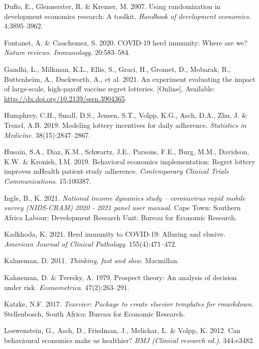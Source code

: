 \documentclass[11pt,preprint, authoryear]{elsarticle}
\numberwithin{equation}{section}
\numberwithin{figure}{section}
\numberwithin{table}{section}
\newlength{\cslhangindent}
\newenvironment{CSLReferences}%
  {\setlength{\parindent}{0pt}%
  \everypar{\setlength{\hangindent}{\cslhangindent}}\ignorespaces}%
  {\par}
\begin{document}
\begin{CSLReferences}{1}{0}
\leavevmode\hypertarget{ref-random}{}%
Duflo, E., Glennerster, R. \& Kremer, M. 2007. Using randomization in
development economics research: A toolkit. \emph{Handbook of development
economics}. 4:3895--3962.

\leavevmode\hypertarget{ref-immun}{}%
Fontanet, A. \& Cauchemez, S. 2020. COVID-19 herd immunity: Where are
we? \emph{Nature reviews. Immunology}. 20:583--584.

\leavevmode\hypertarget{ref-duck}{}%
Gandhi, L., Milkman, K.L., Ellis, S., Graci, H., Gromet, D., Mobarak,
R., Buttenheim, A., Duckworth, A., et al. 2021. An experiment evaluating
the impact of large-scale, high-payoff vaccine regret lotteries.
{[}Online{]}, Available: \url{http://dx.doi.org/10.2139/ssrn.3904365}.

\leavevmode\hypertarget{ref-adhere}{}%
Humphrey, C.H., Small, D.S., Jensen, S.T., Volpp, K.G., Asch, D.A., Zhu,
J. \& Troxel, A.B. 2019. Modeling lottery incentives for daily
adherence. \emph{Statistics in Medicine}. 38(15):2847--2867.

\leavevmode\hypertarget{ref-regr}{}%
Husain, S.A., Diaz, K.M., Schwartz, J.E., Parsons, F.E., Burg, M.M.,
Davidson, K.W. \& Kronish, I.M. 2019. Behavioral economics
implementation: Regret lottery improves mHealth patient study adherence.
\emph{Contemporary Clinical Trials Communications}. 15:100387.

\leavevmode\hypertarget{ref-nids}{}%
Ingle, B., K. 2021. \emph{National income dynamics study -- coronavirus
rapid mobile survey (NIDS-CRAM) 2020 - 2021 panel user manual.} Cape
Town: Southern Africa Labour; Development Research Unit: Bureau for
Economic Research.

\leavevmode\hypertarget{ref-bad}{}%
Kadkhoda, K. 2021. Herd immunity to COVID-19: Alluring and elusive.
\emph{American Journal of Clinical Pathology}. 155(4):471--472.

\leavevmode\hypertarget{ref-fast}{}%
Kahneman, D. 2011. \emph{Thinking, fast and slow}. Macmillan.

\leavevmode\hypertarget{ref-prospect}{}%
Kahneman, D. \& Tversky, A. 1979. Prospect theory: An analysis of
decision under risk. \emph{Econometrica}. 47(2):263--291.

\leavevmode\hypertarget{ref-Texevier}{}%
Katzke, N.F. 2017. \emph{{Texevier}: {P}ackage to create elsevier
templates for rmarkdown}. Stellenbosch, South Africa: Bureau for
Economic Research.

\leavevmode\hypertarget{ref-health}{}%
Loewenstein, G., Asch, D., Friedman, J., Melichar, L. \& Volpp, K. 2012.
Can behavioural economics make us healthier? \emph{BMJ (Clinical
research ed.)}. 344:e3482.


\end{CSLReferences}
\end{document}
